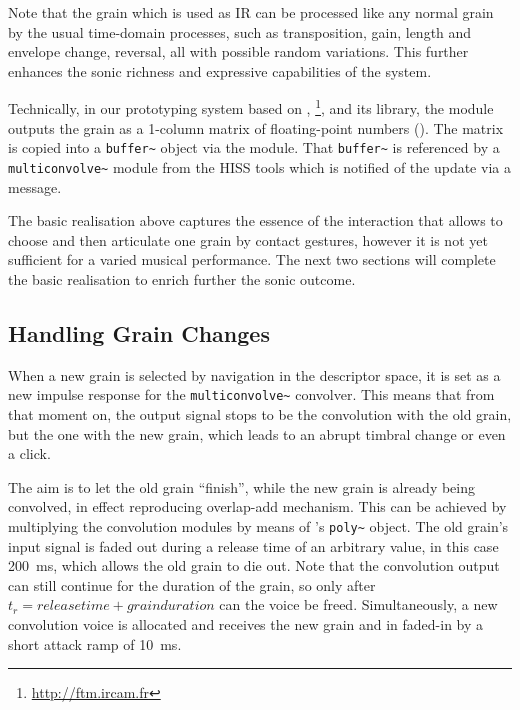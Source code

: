 Note that the grain which is used as IR can be processed like any normal grain by the usual time-domain processes, such as transposition, gain, length and envelope change, reversal, all with possible random variations. This further enhances the sonic richness and expressive capabilities of the system.

Technically, in our prototyping system based on , \footnote{\url{http://ftm.ircam.fr}}, and its   library, the  module outputs the grain as a 1-column matrix of floating-point numbers ().  The matrix is copied into a \verb|buffer~| object via the  module.
That \verb|buffer~| is referenced by a \verb|multiconvolve~| module from the HISS tools which is notified of the update via a message.


The basic realisation above captures the essence of the interaction that allows to choose and then articulate one grain by contact gestures, however it is not yet sufficient for a varied musical performance.  The next two sections will complete the basic realisation to enrich further the sonic outcome.


\subsection{Handling Grain Changes}\label{sec:set}

When a new grain is selected by navigation in the descriptor space, it is set as a new impulse response for the \verb|multiconvolve~| convolver.  This means that from that moment on, the output signal stops to be the convolution with the old grain, but the one with the new grain, which leads to an abrupt timbral change or even a click.

The aim is to let the old grain ``finish'', while the new grain is already being convolved, in effect reproducing overlap-add mechanism.  This can be achieved by multiplying the convolution modules by means of \maxmsp's \verb|poly~| object.  The old grain's input signal is faded out during a release time of an arbitrary value, in this case 200~ms, which allows the old grain to die out.  Note that the convolution output can still continue for the duration of the grain, so only after $t_r = release time + grain duration$ can the voice be freed.  Simultaneously, a new convolution voice is allocated and receives the new grain and in faded-in by a short attack ramp of 10~ms.

